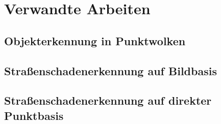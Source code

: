 
\chapter{Verwandte Arbeiten}

\section{Objekterkennung in Punktwolken}

\section{Straßenschadenerkennung auf Bildbasis}

\section{Straßenschadenerkennung auf direkter Punktbasis} %

